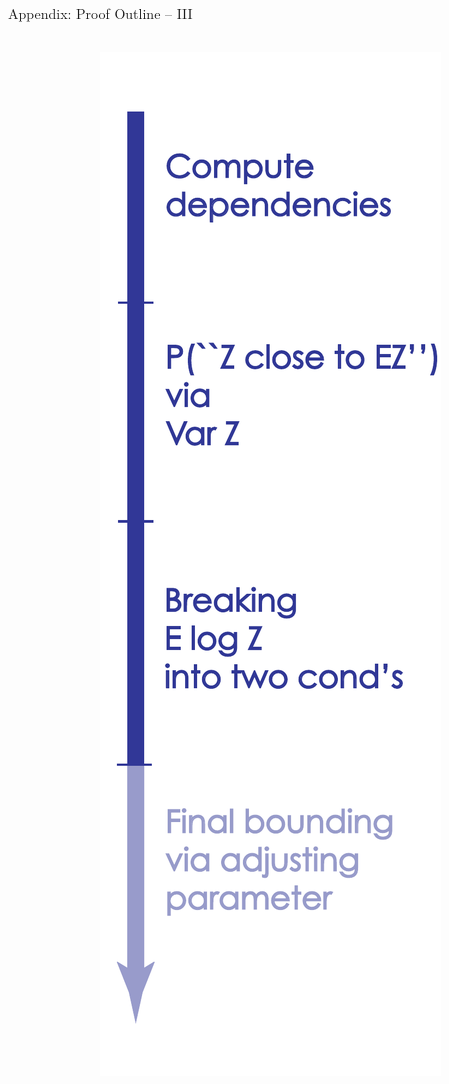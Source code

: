 \documentclass[presentation,12pt]{beamer}
\begin{document}
\begin{frame}{Appendix: Proof Outline -- III}
\begin{columns}
\begin{column}{0.8\textwidth}
  \end{column}
  \begin{column}{0.2\textwidth}
  \hfill \includegraphics[scale=.23]{Proof-3.pdf}

  \end{column}
  \end{columns}
\end{frame}
\end{document}
